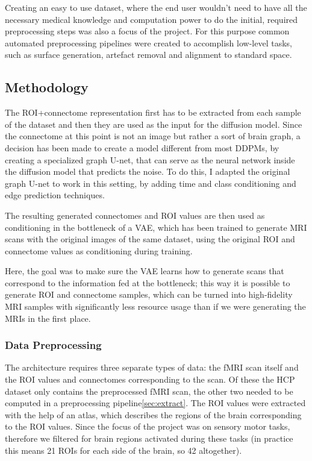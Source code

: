 	Creating an easy to use dataset, where the end user wouldn’t need to have all the necessary medical knowledge and computation power to do the initial, required preprocessing steps was also a focus of the project. For this purpose common automated preprocessing pipelines were created to accomplish low-level tasks, such as surface generation, artefact removal and alignment to standard space\cite{glasser2013minimal}.
	
	\subsection{Methodology}
	
	The ROI+connectome representation first has to be extracted from each sample of the dataset and then they are used as the input for the diffusion model. Since the connectome at this point is not an image but rather a sort of brain graph, a decision has been made to create a model different from most DDPMs, by creating a specialized graph U-net, that can serve as the neural network inside the diffusion model that predicts the noise. To do this, I adapted the original graph U-net\cite{graph-u-net} to work in this setting, by adding time and class conditioning and edge prediction techniques.
	
	The resulting generated connectomes and ROI values are then used as conditioning in the bottleneck of a VAE, which has been trained to generate MRI scans with the original images of the same dataset, using the original ROI and connectome values as conditioning during training. 
	
	Here, the goal was to make sure the VAE learns how to generate scans that correspond to the information fed at the bottleneck; this way it is possible to generate ROI and connectome samples, which can be turned into high-fidelity MRI samples with significantly less resource usage than if we were generating the MRIs in the first place.
	
	\subsubsection{Data Preprocessing}
	
	The architecture requires three separate types of data: the fMRI scan itself and the ROI values and connectomes corresponding to the scan. Of these the HCP dataset only contains the preprocessed fMRI scan, the other two needed to be computed in a preprocessing pipeline\ref{sec:extract}. The ROI values were extracted with the help of an atlas, which describes the regions of the brain corresponding to the ROI values. Since the focus of the project was on sensory motor tasks, therefore we filtered for brain regions activated during these tasks (in practice this means 21 ROIs for each side of the brain, so 42 altogether). 
	
